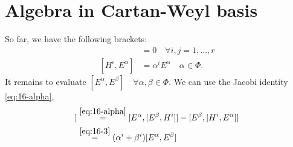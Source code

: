 \section{Algebra in Cartan-Weyl basis}%
\label{sec:algebra_in_cartan_weyl_basis}

So far, we have the following brackets:
\begin{align}
  [H^{i}, H^{j}] &= 0 \quad \forall i , j = 1, \dots, r \\
  [H^{i}, E^{\alpha}] &= \alpha^{i} E^{\alpha} \quad \alpha \in \Phi.
\end{align}
It remains to evaluate $[E^{\alpha}, E^{\beta}] \quad \forall \alpha, \beta \in \Phi$.
We can use the Jacobi identity \eqref{eq:16-alpha}, 
\begin{align}
  [H^{i}, [E^{\alpha}, E^{\beta}]] &\stackrel{\eqref{eq:16-alpha}}{=} [E^{\alpha}, [E^{\beta}, H^{i}]] - [E^{\beta}, [H^{i}, E^{\alpha}]] \\
				   &\stackrel{\eqref{eq:16-3}}{=} (\alpha^{i} + \beta^{i}) [E^{\alpha}, E^{\beta}]
\end{align}
